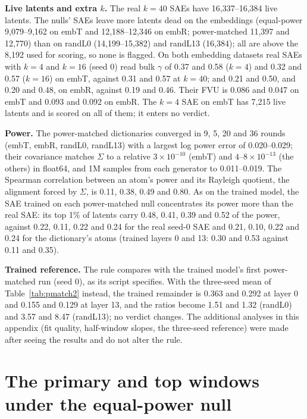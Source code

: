 \documentclass{article}
\newcommand{\Sig}{\Sigma}
\begin{document}
\textbf{Live latents and extra $k$.} The real $k=40$ SAEs have 16,337--16,384 live latents. The nulls' SAEs leave more latents dead on the embeddings (equal-power 9,079--9,162 on embT and 12,188--12,346 on embR; power-matched 11,397 and 12,770) than on randL0 (14,199--15,382) and randL13 (16,384); all are above the 8,192 used for scoring, so none is flagged. On both embedding datasets real SAEs with $k=4$ and $k=16$ (seed 0) read bulk $\gamma$ of 0.37 and 0.58 ($k=4$) and 0.32 and 0.57 ($k=16$) on embT, against 0.31 and 0.57 at $k=40$; and 0.21 and 0.50, and 0.20 and 0.48, on embR, against 0.19 and 0.46. Their FVU is 0.086 and 0.047 on embT and 0.093 and 0.092 on embR. The $k=4$ SAE on embT has 7,215 live latents and is scored on all of them; it enters no verdict.

\textbf{Power.} The power-matched dictionaries converged in 9, 5, 20 and 36 rounds (embT, embR, randL0, randL13) with a largest log power error of 0.020--0.029; their covariance matches $\Sig$ to a relative $3\times10^{-10}$ (embT) and $4$--$8\times10^{-13}$ (the others) in float64, and 1M samples from each generator to 0.011--0.019. The Spearman correlation between an atom's power and its Rayleigh quotient, the alignment forced by $\Sig$, is 0.11, 0.38, 0.49 and 0.80. As on the trained model, the SAE trained on each power-matched null concentrates its power more than the real SAE: its top 1\% of latents carry 0.48, 0.41, 0.39 and 0.52 of the power, against 0.22, 0.11, 0.22 and 0.24 for the real seed-0 SAE and 0.21, 0.10, 0.22 and 0.24 for the dictionary's atoms (trained layers 0 and 13: 0.30 and 0.53 against 0.11 and 0.35).

\textbf{Trained reference.} The rule compares with the trained model's first power-matched run (seed 0), as its script specifies. With the three-seed mean of Table~\ref{tab:pmatch2} instead, the trained remainder is 0.363 and 0.292 at layer 0 and 0.155 and 0.129 at layer 13, and the ratios become 1.51 and 1.32 (randL0) and 3.57 and 8.47 (randL13); no verdict changes. The additional analyses in this appendix (fit quality, half-window slopes, the three-seed reference) were made after seeing the results and do not alter the rule.

\section{The primary and top windows under the equal-power null}
\label{app:primary}

\begin{table}[!htb]
\centering
\caption{Real and equal-power null SAEs at eight layers of Gemma-2-2B in the reference setting ($k=40$, width 16,384; real three seeds, null two). $\rho$ is the null's dense share. Each $\gamma$ is a seed mean. The interval is a 90\% Welch interval from the seed spread, with 1.0--2.5 degrees of freedom. It lies inside $\pm 0.06$, a margin chosen after seeing the data, at layers 9, 13 and 17, and excludes zero at every layer but 17. The null's own dictionary has $\gamma=0.986$--1.000 in every window.}
\label{tab:matched}
\small

\end{table}
\end{document}
